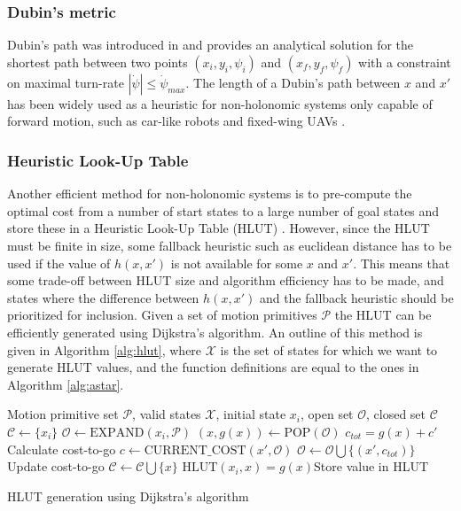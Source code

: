 \subsubsection{Dubin's metric}
Dubin's path was introduced in \cite{dubins} and provides an analytical solution for the
shortest path between two points $(x_i,y_i,\psi_i)$ and $(x_f,y_f,\psi_f)$ with a constraint on maximal turn-rate $|\dot{\psi}|\leq\dot{\psi}_{max}$.
The length of a Dubin's path between $x$ and $x'$ has been widely used as a heuristic for non-holonomic systems only capable of forward motion, such as car-like robots and fixed-wing UAVs \cite{2_phase_uav}.
\subsubsection{Heuristic Look-Up Table}\label{sec:hlut}
Another efficient method for non-holonomic systems is to pre-compute the optimal cost from a number of start states to 
a large number of goal states and store these in a Heuristic Look-Up Table (HLUT) \cite{hlut}. However, since the HLUT 
must be finite in size, some fallback heuristic such as euclidean distance has to be used if the value of $h(x,x')$ is not available for some $x$ and $x'$.
This means that some trade-off between HLUT size and algorithm efficiency has to be made, and states where the difference between $h(x,x')$ and the fallback heuristic 
should be prioritized for inclusion. Given a set of motion primitives $\mathcal{P}$ the HLUT can be efficiently generated using Dijkstra's algorithm. 
An outline of this method is given in Algorithm \ref{alg:hlut}, where $\mathcal{X}$ is the set of states for which we want to generate HLUT values, and the function definitions 
are equal to the ones in Algorithm \ref{alg:astar}.

\begin{algorithm}
    \begin{algorithmic}
        \Require Motion primitive set $\mathcal{P}$, valid states $\mathcal{X}$, initial state $x_i$, open set $\mathcal{O}$, closed set $\mathcal{C}$
            \State $\mathcal{C}\gets \{x_i\}$
            \State $\mathcal{O}\gets\text{EXPAND}(x_i, \mathcal{P})$
                \State $(x,g(x))\gets \text{POP}(\mathcal{O})$
                        \State $c_{tot}=g(x) + c'$ \Comment Calculate cost-to-go
                        \State $c\gets\text{CURRENT\_COST}(x', \mathcal{O})$
                            \State $\mathcal{O}\gets\mathcal{O}\bigcup\{(x',c_{tot})\}$\Comment Update cost-to-go
                        \EndIf
                    \EndIf
                \EndFor
            \State $\mathcal{C}\gets\mathcal{C}\bigcup \{x\}$
            \State $\text{HLUT}(x_i,x)=g(x)$\Comment Store value in HLUT
            \EndWhile
        \end{algorithmic}
        \caption{HLUT generation using Dijkstra's algorithm}
        \label{alg:hlut}
\end{algorithm}

